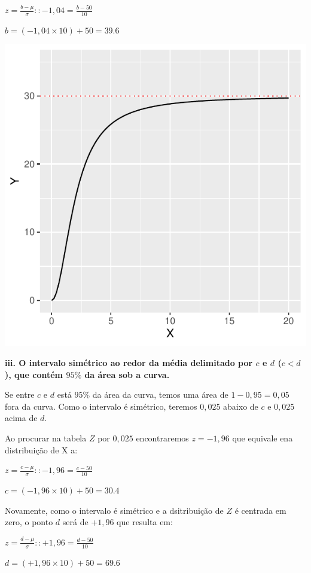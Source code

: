 \documentclass[
]{book}
\begin{document}
\(z = \frac{b - \mu}{\sigma} :: -1,04 = \frac{b - 50}{10}\)

\(b = (-1,04 \times 10) + 50 = 39.6\)

\includegraphics{probest-cambientais_files/figure-latex/unnamed-chunk-218-1.pdf}

\textbf{iii. O intervalo simétrico ao redor da média delimitado por \(c\) e \(d\) (\(c < d\)), que contém \(95\%\) da área sob a curva.}

Se entre \(c\) e \(d\) está \(95\%\) da área da curva, temos uma área de \(1 - 0,95 = 0,05\) fora da curva. Como o intervalo é simétrico, teremos \(0,025\) abaixo de \(c\) e \(0,025\) acima de \(d\).

Ao procurar na tabela \(Z\) por \(0,025\) encontraremos \(z = -1,96\) que equivale ena distribuição de X a:

\(z = \frac{c - \mu}{\sigma} :: -1,96 = \frac{c - 50}{10}\)

\(c = (-1,96 \times 10) + 50 = 30.4\)

Novamente, como o intervalo é simétrico e a dsitribuição de \(Z\) é centrada em zero, o ponto \(d\) será de +\(1,96\) que resulta em:

\(z = \frac{d - \mu}{\sigma} :: +1,96 = \frac{d - 50}{10}\)

\(d = (+1,96 \times 10) + 50 = 69.6\)
\end{document}

